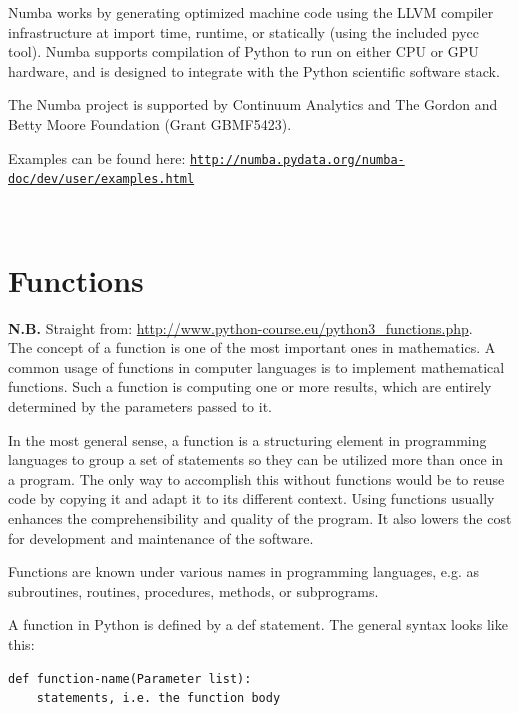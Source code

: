 \documentclass[11pt,a4paper]{article}
\begin{document}
Numba works by generating optimized machine code using the LLVM
compiler infrastructure at import time, runtime, or statically (using
the included pycc tool). Numba supports compilation of Python to run
on either CPU or GPU hardware, and is designed to integrate with the
Python scientific software stack.

The Numba project is supported by Continuum Analytics and The Gordon
and Betty Moore Foundation (Grant GBMF5423).

Examples can be found here:
\href{http://numba.pydata.org/numba-doc/dev/user/examples.html}{\tt http://numba.pydata.org/numba-doc/dev/user/examples.html}
\begin{lstlisting}
      
    \end{lstlisting}




\newpage
\section{Functions}
{\bf N.B.} Straight from: \href{http://www.python-course.eu/python3\_functions.php}{http://www.python-course.eu/python3\_functions.php}. \\

\noindent
The concept of a function is one of the most important ones in
mathematics. A common usage of functions in computer languages is to
implement mathematical functions. Such a function is computing one or
more results, which are entirely determined by the parameters passed
to it.

\noindent
In the most general sense, a function is a structuring element in
programming languages to group a set of statements so they can be
utilized more than once in a program. The only way to accomplish this
without functions would be to reuse code by copying it and adapt it to
its different context. Using functions usually enhances the
comprehensibility and quality of the program. It also lowers the cost
for development and maintenance of the software.

\noindent
Functions are known under various names in programming languages,
e.g. as subroutines, routines, procedures, methods, or subprograms.

\smallskip \smallskip
\noindent
A function in Python is defined by a def statement. The general syntax looks like this:
\begin{lstlisting}
def function-name(Parameter list):
    statements, i.e. the function body
\end{lstlisting}
\end{document}
